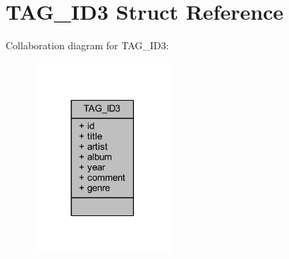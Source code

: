 \hypertarget{struct_t_a_g___i_d3}{\section{T\-A\-G\-\_\-\-I\-D3 Struct Reference}
\label{struct_t_a_g___i_d3}
}


Collaboration diagram for T\-A\-G\-\_\-\-I\-D3\-:\nopagebreak
\begin{figure}[H]
\begin{center}
\leavevmode
\includegraphics[width=146pt]{struct_t_a_g___i_d3__coll__graph}
\end{center}
\end{figure}
